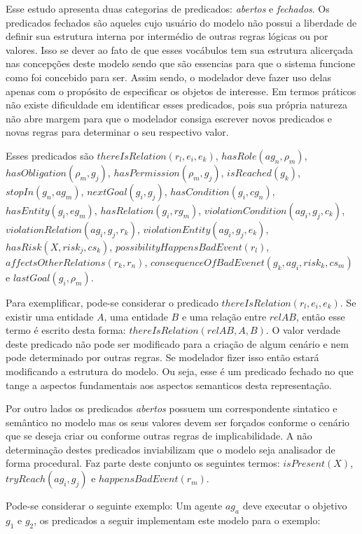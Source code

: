 Esse estudo apresenta duas categorias de predicados: \textit{abertos} e \textit{fechados}. Os predicados fechados são aqueles cujo usuário do modelo não possui a liberdade de definir sua
estrutura interna por intermédio de outras regras lógicas ou por valores. Isso se dever ao fato de que esses vocábulos tem sua estrutura alicerçada nas concepções deste modelo sendo que 
são essencias para que o sistema funcione como foi concebido para ser. Assim sendo, o modelador deve fazer uso delas apenas com o propósito de especificar os objetos de interesse. 
Em termos práticos não existe dificuldade em identificar esses predicados, pois sua própria natureza não abre margem para que o modelador consiga escrever novos predicados e novas regras para 
determinar o seu respectivo valor. 

Esses predicados são $thereIsRelation(r_l,e_i,e_k)$, $hasRole(ag_n,\rho_m)$, $hasObligation(\rho_m,g_j)$,
$hasPermission(\rho_m, g_j)$, $isReached(g_k)$, $stopIn(g_n, ag_m)$, $nextGoal(g_i,g_j)$, $hasCondition(g_i,cg_n)$,
$hasEntity(g_i,eg_m)$, $hasRelation(g_i,rg_m)$, $violationCondition(ag_i,g_j,c_k) $, $ violationRelation(ag_i,g_j,r_k) $,
$ violationEntity(ag_i,g_j,e_k) $,  $ hasRisk(X, risk_j, cs_k) $, $possibilityHappensBadEvent(r_l)$, 
$affectsOtherRelations(r_k,r_n)$, $consequenceOfBadEvenet(g_k, ag_i,risk_k,cs_m)$  e $lastGoal(g_i,\rho_m)$. 


Para exemplificar, pode-se considerar o predicado $thereIsRelation(r_l,e_i,e_k)$. Se existir uma entidade $A$,
uma entidade $B$ e uma relação entre $relAB$, então esse termo é escrito desta forma: 
$thereIsRelation(relAB,A,B)$. O valor verdade deste predicado não pode ser modificado para a criação de algum 
cenário e nem pode determinado por outras regras. Se modelador fizer isso então estará modificando a estrutura 
do modelo. Ou seja, esse é um predicado fechado no que tange a aspectos fundamentais aos aspectos semanticos 
desta representação. 

Por outro lados os predicados \textit{abertos} possuem um correspondente sintatico e semântico no modelo mas 
os seus valores devem ser forçados conforme o cenário que se deseja criar ou conforme outras regras de 
implicabilidade. A não determinação destes predicados inviabilizam que o modelo seja analisador de forma 
procedural. Faz parte deste conjunto os seguintes termos: $isPresent(X)$,$tryReach(ag_i,g_j)$ e $happensBadEvent(r_m)$.

Pode-se considerar o seguinte exemplo: Um agente $ag_a$ deve executar o objetivo $g_1$ e $g_2$, os predicados 
a seguir implementam este modelo para o exemplo:

